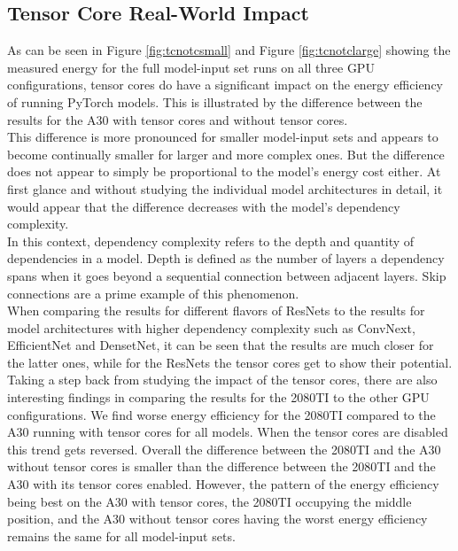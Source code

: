 \subsection{Tensor Core Real-World Impact}
As can be seen in Figure \ref{fig:tcnotcsmall} and Figure \ref{fig:tcnotclarge} showing the measured energy for the full model-input set runs on all three GPU configurations, tensor cores do have a significant impact on the energy efficiency of running PyTorch models. This is illustrated by the difference between the results for the A30 with tensor cores and without tensor cores. \\
This difference is more pronounced for smaller model-input sets and appears to become continually smaller for larger and more complex ones. But the difference does not appear to simply be proportional to the model's energy cost either. At first glance and without studying the individual model architectures in detail, it would appear that the difference decreases with the model's dependency complexity. \\
In this context, dependency complexity refers to the depth and quantity of dependencies in a model. Depth is defined as the number of layers a dependency spans when it goes beyond a sequential connection between adjacent layers. Skip connections are a prime example of this phenomenon. \\
When comparing the results for different flavors of ResNets to the results for model architectures with higher dependency complexity such as ConvNext, EfficientNet and DensetNet, it can be seen that the results are much closer for the latter ones, while for the ResNets the tensor cores get to show their potential. \\
Taking a step back from studying the impact of the tensor cores, there are also interesting findings in comparing the results for the 2080TI to the other GPU configurations. We find worse energy efficiency for the 2080TI compared to the A30 running with tensor cores for all models. When the tensor cores are disabled this trend gets reversed. Overall the difference between the 2080TI and the A30 without tensor cores is smaller than the difference between the 2080TI and the A30 with its tensor cores enabled. However, the pattern of the energy efficiency being best on the A30 with tensor cores, the 2080TI occupying the middle position, and the A30 without tensor cores having the worst energy efficiency remains the same for all model-input sets.


